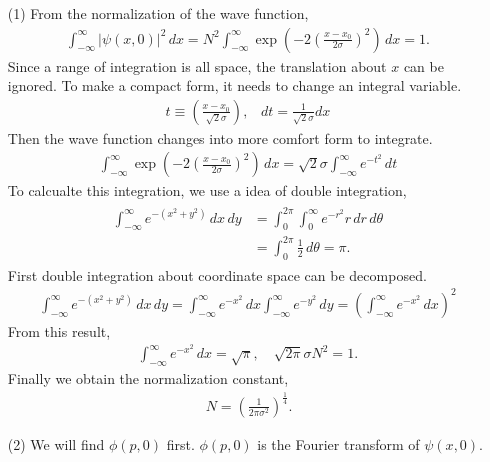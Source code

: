 \documentclass[floatfix,nofootinbib,superscriptaddress,fleqn]{revtex4-2}
\begin{document}
\begin{itemize}
  \item[(1)] From the normalization of the wave function,
  \begin{align*}
    \int_{-\infty}^{\infty} |\psi(x,0)|^2\,dx=N^2\int_{-\infty}^{\infty}
    \exp\left(-2{\left(\frac{x-x_0}{2\sigma}\right)}^2\right) \,dx =1.
  \end{align*}
Since a range of integration is all space, the translation 
about $x$ can be ignored.
To make a compact form, it needs to change an integral variable.
  \begin{align*}
    t \equiv \left(\frac{x-x_0}{\sqrt{2}\sigma}\right),\;\;\; dt 
    = \frac{1}{\sqrt{2}\sigma} dx 
  \end{align*}
Then the wave function changes into more comfort form to integrate.
  \begin{align}\label{eq:gt}
    \int_{-\infty}^{\infty}\exp\left(-2{\left(
      \frac{x-x_0}{2\sigma}\right)}^2\right) \,dx
    =\sqrt{2}\sigma \int_{-\infty}^{\infty} e^{-t^2} \,dt
  \end{align}
To calcualte this integration, we use a idea of double integration,
  \begin{align*}
    \begin{split} 
      \int_{-\infty}^{\infty} e^{-(x^2+y^2)}\,dx\,dy 
      &= \int_{0}^{2\pi}\int_{0}^{\infty} e^{-r^2}r\,dr\,d\theta
      \\   &= \int_{0}^{2\pi}\frac{1}{2}\,d\theta = \pi.
    \end{split}
  \end{align*}
First double integration about coordinate space can be decomposed.
  \begin{align*}
    \int_{-\infty}^{\infty} e^{-(x^2+y^2)}\,dx\,dy 
    = \int_{-\infty}^{\infty} e^{-x^2}\,dx\int_{-\infty}^{\infty}e^{-y^2}\,dy
    = \left(\int_{-\infty}^{\infty} e^{-x^2}\,dx\right)^2
  \end{align*}
From this result,
  \begin{align*}
    \int_{-\infty}^{\infty} e^{-x^2} \,dx 
    = \sqrt{\pi},\quad \sqrt{2\pi}\sigma N^2 =1.
  \end{align*}
Finally we obtain the normalization constant,
  \begin{align}
    \,N = {\left(\frac{1}{2\pi\sigma^2}\right)}^{\frac{1}{4}}.
  \end{align}
  \item[(2)]  We will find $\phi(p,0)$ first. 
  $\phi(p,0)$ is the Fourier transform of $\psi(x,0)$.
  \begin{align*}

\end{align*}
\end{itemize}
\end{document}
